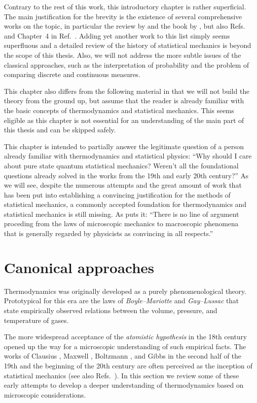 \documentclass[a4paper,12pt,listof=totoc,index=totoc,bibliography=totoc,headsepline=false,headings=normal,BCOR16.153846mm,DIV12,headinclude,twoside,cleardoublepage=empty,numbers=noenddot,final]{scrreprt}
\theoremstyle{mystyle}
\numberwithin{equation}{section}
\numberwithin{figure}{section}
\numberwithin{lemma}{section}
\numberwithin{theorem}{section}
\numberwithin{corollary}{section}
\numberwithin{definition}{section}
\numberwithin{conjecture}{section}
\numberwithin{observation}{section}
\newcommand{\+}{\mkern2mu}
\DeclareMathOperator{\1}{\mathds{1}}
\begin{document}
Contrary to the rest of this work, this introductory chapter is rather superficial.
The main justification for the brevity is the existence of several comprehensive works on the topic, in particular the review by \textcite{UffinkFinal} and the book by \textcite{Sklar1995}, but also Refs.~\cite{RevModPhys.27.289,Ehrenfest2002,Penrose1979} and Chapter~4 in Ref.~\cite{Gemmer09}.
Adding yet another work to this list simply seems superfluous and a detailed review of the history of statistical mechanics is beyond the scope of this thesis.
Also, we will not address the more subtle issues of the classical approaches, such as the interpretation of probability and the problem of comparing discrete and continuous measures.

This chapter also differs from the following material in that we will not build the theory from the ground up, but assume that the reader is already familiar with the basic concepts of thermodynamics and statistical mechanics.
This seems eligible as this chapter is not essential for an understanding of the main part of this thesis and can be skipped safely.

This chapter is intended to partially answer the legitimate question of a person already familiar with thermodynamics and statistical physics: ``Why should I care about pure state quantum statistical mechanics? Weren't all the foundational questions already solved in the works from the 19th and early 20th century?''
As we will see, despite the numerous attempts and the great amount of work that has been put into establishing a convincing justification for the methods of statistical mechanics, a commonly accepted foundation for thermodynamics and statistical mechanics is still missing.
As \textcite{Jaynes} puts it: ``There is no line of argument proceding from the laws of microscopic mechanics to macroscopic phenomena that is generally regarded by physicists as convincing in all respects.''


\section{Canonical approaches}
\label{sec:canonicalapproaches}
%
Thermodynamics was originally developed as a purely phenomenological theory.
Prototypical for this era are the laws of \emph{Boyle--Mariotte} and \emph{Gay--Lussac} that state empirically observed relations between the volume, pressure, and temperature of gases.

The more widespread acceptance of the \emph{atomistic hypothesis} in the 18th century opened up the way for a microscopic understanding of such empirical facts.
The works of Clausius \cite{Clausius1857}, Maxwell \cite{Maxwell1860,Maxwell1860a}, Boltzmann \cite{Boltzmann1872}, and Gibbs \cite{Gibbs1902} in the second half of the 19th and the beginning of the 20th century are often perceived as the inception of statistical mechanics (see also Refs.~\cite{Boltzmann1896,UffinkFinal,Sklar1995}).
In this section we review some of these early attempts to develop a deeper understanding of thermodynamics based on microscopic considerations.
\end{document}
